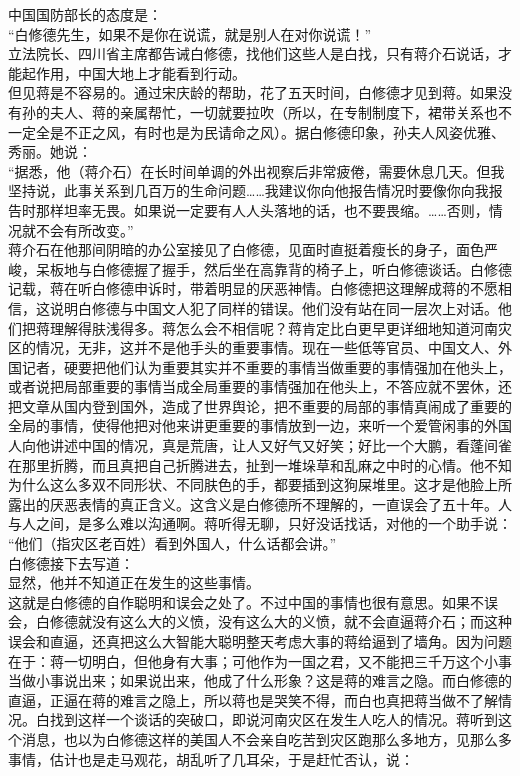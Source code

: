 中国国防部长的态度是：\\

“白修德先生，如果不是你在说谎，就是别人在对你说谎！”\\

立法院长、四川省主席都告诫白修德，找他们这些人是白找，只有蒋介石说话，才能起作用，中国大地上才能看到行动。\\

但见蒋是不容易的。通过宋庆龄的帮助，花了五天时间，白修德才见到蒋。如果没有孙的夫人、蒋的亲属帮忙，一切就要拉吹（所以，在专制制度下，裙带关系也不一定全是不正之风，有时也是为民请命之风）。据白修德印象，孙夫人风姿优雅、秀丽。她说：\\

“据悉，他（蒋介石）在长时间单调的外出视察后非常疲倦，需要休息几天。但我坚持说，此事关系到几百万的生命问题……我建议你向他报告情况时要像你向我报告时那样坦率无畏。如果说一定要有人人头落地的话，也不要畏缩。……否则，情况就不会有所改变。”\\

蒋介石在他那间阴暗的办公室接见了白修德，见面时直挺着瘦长的身子，面色严峻，呆板地与白修德握了握手，然后坐在高靠背的椅子上，听白修德谈话。白修德记载，蒋在听白修德申诉时，带着明显的厌恶神情。白修德把这理解成蒋的不愿相信，这说明白修德与中国文人犯了同样的错误。他们没有站在同一层次上对话。他们把蒋理解得肤浅得多。蒋怎么会不相信呢？蒋肯定比白更早更详细地知道河南灾区的情况，无非，这并不是他手头的重要事情。现在一些低等官员、中国文人、外国记者，硬要把他们认为重要其实并不重要的事情当做重要的事情强加在他头上，或者说把局部重要的事情当成全局重要的事情强加在他头上，不答应就不罢休，还把文章从国内登到国外，造成了世界舆论，把不重要的局部的事情真闹成了重要的全局的事情，使得他把对他来讲更重要的事情放到一边，来听一个爱管闲事的外国人向他讲述中国的情况，真是荒唐，让人又好气又好笑；好比一个大鹏，看蓬间雀在那里折腾，而且真把自己折腾进去，扯到一堆垛草和乱麻之中时的心情。他不知为什么这么多双不同形状、不同肤色的手，都要插到这狗屎堆里。这才是他脸上所露出的厌恶表情的真正含义。这含义是白修德所不理解的，一直误会了五十年。人与人之间，是多么难以沟通啊。蒋听得无聊，只好没话找话，对他的一个助手说：\\

“他们（指灾区老百姓）看到外国人，什么话都会讲。”\\

白修德接下去写道：\\

显然，他并不知道正在发生的这些事情。\\

这就是白修德的自作聪明和误会之处了。不过中国的事情也很有意思。如果不误会，白修德就没有这么大的义愤，没有这么大的义愤，就不会直逼蒋介石；而这种误会和直逼，还真把这么大智能大聪明整天考虑大事的蒋给逼到了墙角。因为问题在于：蒋一切明白，但他身有大事；可他作为一国之君，又不能把三千万这个小事当做小事说出来；如果说出来，他成了什么形象？这是蒋的难言之隐。而白修德的直逼，正逼在蒋的难言之隐上，所以蒋也是哭笑不得，而白也真把蒋当做不了解情况。白找到这样一个谈话的突破口，即说河南灾区在发生人吃人的情况。蒋听到这个消息，也以为白修德这样的美国人不会亲自吃苦到灾区跑那么多地方，见那么多事情，估计也是走马观花，胡乱听了几耳朵，于是赶忙否认，说：\\


